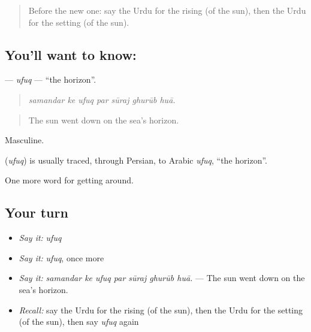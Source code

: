 \label{lesson:UR-C432-ufuq}



\begin{quote}
Before the new one: say the Urdu for the rising (of the sun), then the Urdu for the setting (of the sun).
\end{quote}

\subsection*{You'll want to know: }
\textbf{} — \emph{ufuq} — \textquotedblleft{}the horizon\textquotedblright{}.

\begin{quote}
      
\end{quote}

\begin{quote}
\emph{samandar ke ufuq par sūraj ghurūb huā.}
\end{quote}

\begin{quote}
The sun went down on the sea's horizon.
\end{quote}

Masculine.

\begin{cousinweb}
\textbf{} (\emph{ufuq}) is usually traced, through Persian, to Arabic \emph{ufuq}, \textquotedblleft{}the horizon\textquotedblright{}.
\end{cousinweb}

\begin{grammarlens}[title={What you've built}]
One more word for getting around.
\end{grammarlens}

\subsection*{Your turn}
\begin{itemize}
\raggedright
  \item \emph{Say it:} \emph{ufuq}
  \item \emph{Say it:} \emph{ufuq}, once more
  \item \emph{Say it:} \emph{samandar ke ufuq par sūraj ghurūb huā.} — The sun went down on the sea's horizon.
  \item \emph{Recall:} say the Urdu for the rising (of the sun), then the Urdu for the setting (of the sun), then say \emph{ufuq} again
\end{itemize}

